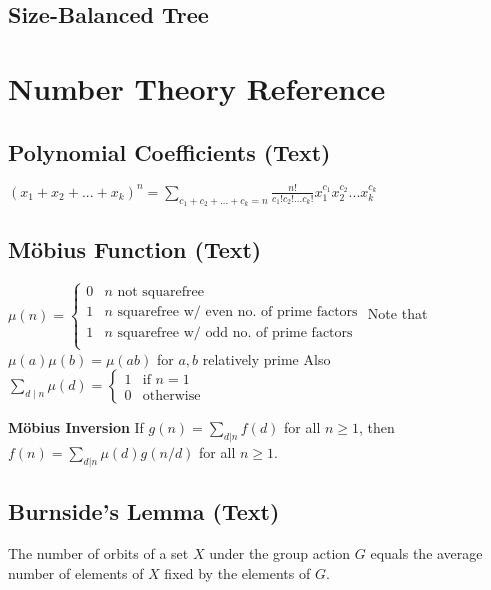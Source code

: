 \documentclass[10pt]{extarticle}
\begin{document}
\begin{multicols*}{3}
\subsection{Size-Balanced Tree}


\section{Number Theory Reference}
\subsection{Polynomial Coefficients (Text)} %
$(x_1 + x_2 + ... + x_k)^n = \sum_{c_1 + c_2 + ... + c_k = n}
\frac{n!}{c_1! c_2! ... c_k!} x_1^{c_1} x_2^{c_2} ... x_k^{c_k}$

\subsection{M\"obius Function (Text)} %
$\mu(n) = \begin{cases}
0 & \text{$n$ not squarefree} \\
1 & \text{$n$ squarefree w/ even no. of prime factors} \\
1 & \text{$n$ squarefree w/ odd no. of prime factors} \\
\end{cases}$
Note that $\mu(a) \mu(b) = \mu(ab)$ for $a, b$ relatively prime
Also $\sum_{d \mid n} \mu(d) = \begin{cases} 1 & \text{if $n = 1$} \\
0 & \text{otherwise} \end{cases}$

\textbf{M\"obius Inversion}
If $g(n) = \sum_{d|n} f(d)$ for all $n \ge 1$, then
$f(n) = \sum_{d|n} \mu(d)g(n/d)$ for all $n \ge 1$.

\subsection{Burnside's Lemma (Text)} %
The number of orbits of a set $X$ under the group action $G$ equals the average
number of elements of $X$ fixed by the elements of $G$.


\end{multicols*}
\end{document}
